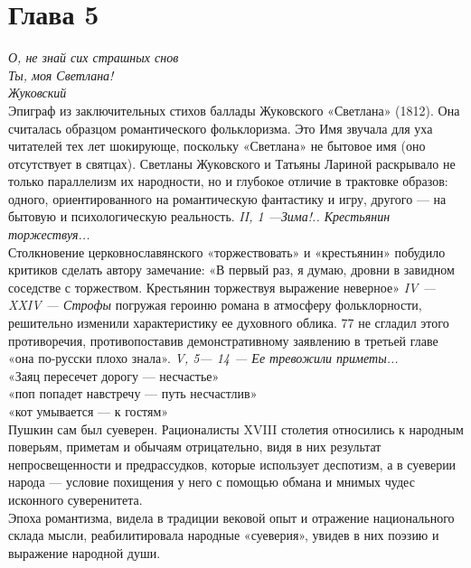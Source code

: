 \section{Глава 5}
\emph{О, не знай сих страшных снов\\ 
Ты, моя Светлана!\\
 Жуковский}\\
 Эпиграф из заключительных стихов баллады Жуковского «Светлана» (1812). Она считалась образцом романтического фольклоризма. Это Имя звучала для уха читателей тех лет шокирующе, поскольку «Светлана» не бытовое имя (оно 
отсутствует в святцах). Светланы Жуковского и Татьяны Лариной раскрывало не только параллелизм их народности, но и глубокое отличие в трактовке образов: одного, ориентированного на романтическую фантастику и игру, другого — на бытовую и психологическую реальность.
\emph{II, 1 —Зима!.. Крестьянин торжествуя... }\\
Столкновение церковнославянского «торжествовать» и «крестьянин» побудило критиков сделать автору замечание: «В первый раз, я думаю, дровни в завидном соседстве с торжеством. Крестьянин торжествуя выражение неверное»
\emph{IV —XXIV — Строфы} погружая героиню романа в атмосферу фольклорности, решительно изменили характеристику ее духовного облика. 77 не сгладил этого противоречия, противопоставив демонстративному заявлению в третьей главе «она по-русски плохо знала».
\emph{ V, 5— 14 — Ее тревожили приметы... }\\
«Заяц пересечет дорогу — несчастье»\\
 «поп попадет навстречу — путь несчастлив»\\
  «кот умывается — к гостям»\\
Пушкин сам был суеверен. Рационалисты XVIII столетия относились к народным поверьям, приметам и обычаям отрицательно, видя в них результат непросвещенности и предрассудков, которые использует деспотизм, а в суеверии народа — условие похищения у него с помощью обмана и мнимых чудес исконного суверенитета.\\
Эпоха романтизма, видела в традиции вековой опыт и отражение национального склада мысли, реабилитировала народные «суеверия», увидев в них поэзию и выражение народной души.
